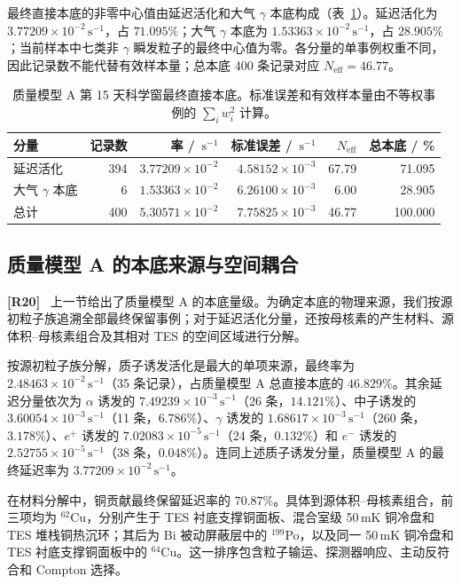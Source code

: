 \documentclass[11pt]{article}
\newcommand{\revmark}[1]{\textcolor{revisionblue}{\textbf{[R#1]}}\ }
\newcommand{\revblue}[1]{\textcolor{revisionblue}{#1}}
\newcommand{\cps}{\,\mathrm{s^{-1}}}
\begin{document}
最终直接本底的非零中心值由延迟活化和\revblue{大气 $\gamma$ 本底}构成（表~\ref{tab:reference_background_budget_zh}）。延迟活化为 $3.77209\times10^{-2}\cps$，占 $71.095\%$；\revblue{大气 $\gamma$ 本底}为 $1.53363\times10^{-2}\cps$，占 $28.905\%$；当前样本中\revblue{七类非 $\gamma$ 瞬发粒子}的最终中心值为零。各分量的单事例权重不同，因此记录数不能代替有效样本量；总本底 400 条记录对应 $N_{\mathrm{eff}}=46.77$。

\begin{table}[H]
\centering
\caption{质量模型 A 第 15 天科学窗最终直接本底。标准误差和有效样本量由不等权事例的 $\sum_i w_i^2$ 计算。}
\label{tab:reference_background_budget_zh}
\footnotesize
\begin{tabular}{lrrrrr}
\toprule
分量 & 记录数 & 率 / $\cps$ & 标准误差 / $\cps$ & $N_{\mathrm{eff}}$ & 总本底 / \% \\
\midrule
延迟活化 & 394 & $3.77209\times10^{-2}$ & $4.58152\times10^{-3}$ & 67.79 & 71.095 \\
\revblue{大气 $\gamma$ 本底} & 6 & $1.53363\times10^{-2}$ & $6.26100\times10^{-3}$ & 6.00 & 28.905 \\
\midrule
总计 & 400 & $5.30571\times10^{-2}$ & $7.75825\times10^{-3}$ & 46.77 & 100.000 \\
\bottomrule
\end{tabular}
\end{table}

\subsection{质量模型 A 的本底来源与空间耦合}
\label{subsec:mass_model_a_origins_zh}

\revmark{20}
\begingroup
\color{revisionblue}
上一节给出了质量模型 A 的本底量级。为确定本底的物理来源，我们按源初粒子族追溯全部最终保留事例；对于延迟活化分量，还按母核素的产生材料、源体积--母核素组合及其相对 TES 的空间区域进行分解。

按源初粒子族分解，质子诱发活化是最大的单项来源，最终率为 $2.48463\times10^{-2}\cps$（35 条记录），占质量模型 A 总直接本底的 $46.829\%$。其余延迟分量依次为 $\alpha$ 诱发的 $7.49239\times10^{-3}\cps$（26 条，$14.121\%$）、中子诱发的 $3.60054\times10^{-3}\cps$（11 条，$6.786\%$）、$\gamma$ 诱发的 $1.68617\times10^{-3}\cps$（260 条，$3.178\%$）、$e^+$ 诱发的 $7.02083\times10^{-5}\cps$（24 条，$0.132\%$）和 $e^-$ 诱发的 $2.52755\times10^{-5}\cps$（38 条，$0.048\%$）。连同上述质子诱发分量，质量模型 A 的最终延迟率为 $3.77209\times10^{-2}\cps$。

在材料分解中，铜贡献最终保留延迟率的 $70.87\%$。具体到源体积--母核素组合，前三项均为 $^{62}$Cu，分别产生于 TES 衬底支撑铜面板、混合室级 50\,mK 铜冷盘和 TES 堆栈铜热沉环；其后为 Bi 被动屏蔽层中的 $^{199}$Po，以及同一 50\,mK 铜冷盘和 TES 衬底支撑铜面板中的 $^{64}$Cu。这一排序包含粒子输运、探测器响应、主动反符合和 Compton 选择。
\end{document}
